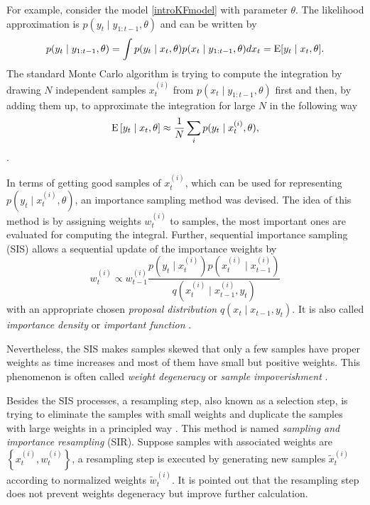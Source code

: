 For example, consider the model \eqref{introKFmodel} with parameter $\theta$. The likelihood approximation is $p(y_t\mid y_{1:t-1},\theta)$ and can be written by
\begin{equation}
p(y_t\mid y_{1:t-1},\theta) = \int p(y_t\mid x_t,\theta)p(x_t\mid y_{1:t-1},\theta) dx_t = \mathrm{E} \lbrack y_t\mid x_t,\theta \rbrack.
\end{equation}
The standard Monte Carlo algorithm is trying to compute the integration by drawing $N$ independent samples $x_t^{(i)}$ from $p(x_t\mid y_{1:t-1},\theta)$ first and then, by adding them up, to approximate the integration for large $N$ in the following way 
\begin{equation}
\mathrm{E}\left[ y_t\mid x_t,\theta \right]\approx \frac{1}{N}\sum_i p(y_t\mid x_t^{(i)},\theta), 
\end{equation}
\citep{kalos2008monte}.

In terms of getting good samples of $x_t^{(i)}$, which can be used for representing $p(y_t\mid x_t^{(i)},\theta)$, an importance sampling method was devised. The idea of this method is by assigning weights $w_t^{(i)}$ to samples, the most important ones are evaluated for computing the integral. Further, sequential importance sampling (SIS) allows a sequential update of the importance weights by 
\begin{equation}
w_t^{(i)} \propto w_{t-1}^{(i)} \frac{ p\left(y_t \mid x_t^{(i)}\right) p\left(x_{t}^{(i)}\mid x_{t-1}^{(i)}\right) }{q\left(x_{t}^{(i)}\mid x_{t-1}^{(i)},y_{t}\right)}
\end{equation}
with an appropriate chosen \textit{proposal distribution} $q(x_{t}\mid  x_{t-1},y_{t})$. It is also called \textit{importance density} or \textit{important function}  \citep{chen2003bayesian}. 


Nevertheless, the SIS makes samples skewed that only a few samples have proper weights as time increases and most of them have small but positive weights. This phenomenon is often called \textit{weight degeneracy} or \textit{sample impoverishment} \citep{green1995reversible, berzuini1997dynamic}. 


Besides the SIS processes, a resampling step, also known as a selection step, is trying to eliminate the samples with small weights and duplicate the samples with large weights in a principled way \citep{rubin2004multiple, tanner1987calculation}. This method is named \textit{sampling and importance resampling} (SIR). Suppose samples with associated weights are $\left\lbrace x_t^{(i)},w_t^{(i)}\right\rbrace$, a resampling step is executed by generating new samples $\tilde{x}_t^{(i)}$ according to normalized weights $\tilde{w}_t^{(i)}$. It is pointed out that the resampling step does not prevent weights degeneracy but improve further calculation. 

